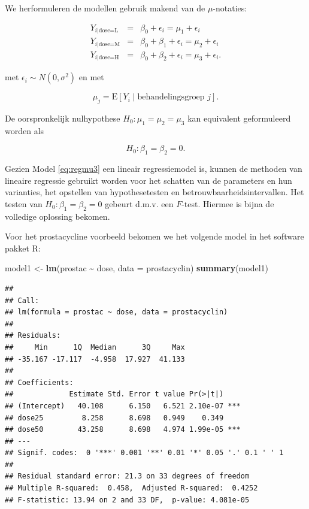 \documentclass[
  12pt,dutch]{book}
\newenvironment{Shaded}{\begin{snugshade}}{\end{snugshade}}
\newcommand{\AttributeTok}[1]{\textcolor[rgb]{0.13,0.29,0.53}{#1}}
\newcommand{\FunctionTok}[1]{\textcolor[rgb]{0.13,0.29,0.53}{\textbf{#1}}}
\newcommand{\NormalTok}[1]{#1}
\newcommand{\OtherTok}[1]{\textcolor[rgb]{0.56,0.35,0.01}{#1}}
\newcommand{\SpecialCharTok}[1]{\textcolor[rgb]{0.81,0.36,0.00}{\textbf{#1}}}
\theoremstyle{definition}
\theoremstyle{definition}
\theoremstyle{definition}
\theoremstyle{definition}
\theoremstyle{remark}
\begin{document}
We herformuleren de modellen gebruik makend van de \(\mu\)-notaties:

\begin{eqnarray*}
 Y_{i\vert \text{dose=L}} &=& \beta_0+\epsilon_i = \mu_1+\epsilon_i \\
 Y_{i\vert \text{dose=M}} &=& \beta_0+\beta_1+ \epsilon_i = \mu_2+\epsilon_i \\
 Y_{i\vert \text{dose=H}} &=& \beta_0+\beta_2 + \epsilon_i = \mu_3+\epsilon_i .
\end{eqnarray*}

met \(\epsilon_i \sim N(0,\sigma^2)\) en met

\[  \mu_j = \text{E}\left[Y_i \mid \text{behandelingsgroep } j\right].\]

De oorspronkelijk nulhypothese \(H_0:\mu_1=\mu_2=\mu_3\) kan equivalent geformuleerd worden als

\[H_0: \beta_1=\beta_2=0.\]

Gezien Model \eqref{eq:regmu3} een lineair regressiemodel is, kunnen de methoden van lineaire regressie gebruikt worden voor het schatten van de parameters en hun varianties, het opstellen van hypothesetesten en betrouwbaarheidsintervallen.
Het testen van \(H_0: \beta_1=\beta_2=0\) gebeurt d.m.v. een \(F\)-test.
Hiermee is bijna de volledige oplossing bekomen.

Voor het prostacycline voorbeeld bekomen we het volgende model in het software pakket R:

\begin{Shaded}
\begin{Highlighting}[]
\NormalTok{model1 }\OtherTok{\textless{}{-}} \FunctionTok{lm}\NormalTok{(prostac }\SpecialCharTok{\textasciitilde{}}\NormalTok{ dose, }\AttributeTok{data =}\NormalTok{ prostacyclin)}
\FunctionTok{summary}\NormalTok{(model1)}
\end{Highlighting}
\end{Shaded}

\begin{verbatim}
## 
## Call:
## lm(formula = prostac ~ dose, data = prostacyclin)
## 
## Residuals:
##     Min      1Q  Median      3Q     Max 
## -35.167 -17.117  -4.958  17.927  41.133 
## 
## Coefficients:
##             Estimate Std. Error t value Pr(>|t|)    
## (Intercept)   40.108      6.150   6.521 2.10e-07 ***
## dose25         8.258      8.698   0.949    0.349    
## dose50        43.258      8.698   4.974 1.99e-05 ***
## ---
## Signif. codes:  0 '***' 0.001 '**' 0.01 '*' 0.05 '.' 0.1 ' ' 1
## 
## Residual standard error: 21.3 on 33 degrees of freedom
## Multiple R-squared:  0.458,  Adjusted R-squared:  0.4252 
## F-statistic: 13.94 on 2 and 33 DF,  p-value: 4.081e-05
\end{verbatim}
\end{document}
